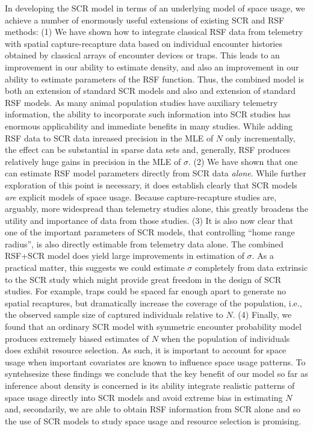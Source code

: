 In developing the SCR model in terms of an underlying model of space
usage, we achieve a number of enormously useful extensions of existing
SCR and RSF methods:
(1) We have shown how to integrate classical RSF data from
telemetry with spatial capture-recapture data based on individual
encounter histories obtained by classical arrays of encounter devices
or traps. This leads to an improvement in our ability to estimate
density, and also an improvement in our ability to estimate parameters
of the RSF function.  Thus, the combined model is both an extension of
standard SCR models and also and extension of standard RSF models. As
many animal population studies have auxiliary telemetry information,
the ability to incorporate such information into SCR studies has
enormous applicability and immediate benefits in many studies.
While adding RSF data to SCR data inreased precision in the MLE of $N$
only incrementally, the effect can be substantial in sparse data sets
and, generally, RSF produces
relatively huge gains in precision in the MLE of $\sigma$.
(2) We have shown that one can estimate RSF model parameters
directly from SCR data {\it alone}.
While further exploration of this point
is necessary,
it does establish clearly that SCR
models {\it are} explicit models of space usage. Because
capture-recapture studies are, arguably, more widespread than
telemetry studies alone, this greatly broadens the utility and
importance of data from those studies.
(3) It is also now clear
that one of the important parameters of SCR models, that controlling
``home range radius'', is also directly estimable from telemetry data
alone.
The combined RSF+SCR model does yield large improvements in estimation
of $\sigma$. As a practical matter, this suggests we could estimate
$\sigma$ completely from data extrinsic to the SCR study which might
provide great freedom in the design of SCR studies. For example, traps
could be spaced far enough apart to generate no spatial recaptures,
but dramatically increase the coverage of the population, i.e., the
observed sample size of captured individuals relative to $N$.
(4) Finally, we found that an
ordinary SCR model with symmetric encounter probability model produces
extremely biased estimates of $N$ when the population of individuals
does exhibit resource selection.  As such, it is important to account
for space usage when important covariates are known to influence
space usage patterns.
To syntehsesize these findings we conclude that
the key benefit of our model so far as inference about density is
concerned is its ability
integrate realistic patterns of space usage directly into SCR models
and avoid extreme bias in estimating $N$ and, secondarily, we are able
to obtain RSF information from SCR alone and so the use of SCR models
to study space usage and resource selection is promising.

